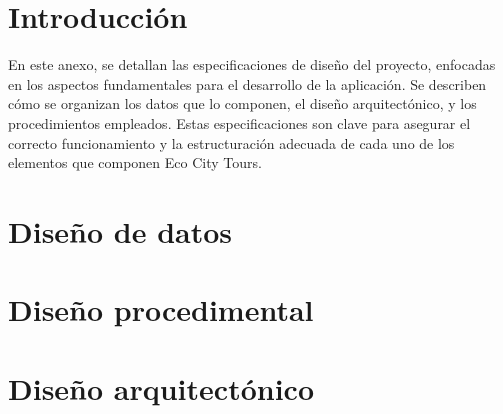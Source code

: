 
\section{Introducción}
En este anexo, se detallan las especificaciones de diseño del proyecto, enfocadas en los aspectos fundamentales para el desarrollo de la aplicación. Se describen cómo se organizan los datos que lo componen, el diseño arquitectónico, y los procedimientos empleados. Estas especificaciones son clave para asegurar el correcto funcionamiento y la estructuración adecuada de cada uno de los elementos que componen Eco City Tours.
\section{Diseño de datos}

\section{Diseño procedimental}

\section{Diseño arquitectónico}

